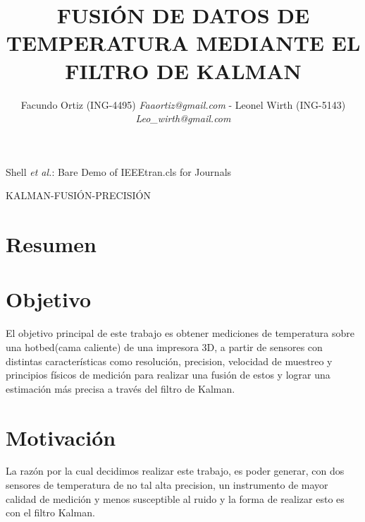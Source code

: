 \documentclass[journal]{IEEEtran}
\begin{document}
\title{FUSIÓN DE DATOS DE TEMPERATURA MEDIANTE EL FILTRO DE KALMAN}


\author{Facundo Ortiz (ING-4495) \textit{Faaortiz@gmail.com} - Leonel Wirth (ING-5143)  \textit{Leo\_wirth@gmail.com}}%



%
{Shell \MakeLowercase{\textit{et al.}}: Bare Demo of IEEEtran.cls for Journals}




\maketitle


\begin{IEEEkeywords}
KALMAN-FUSIÓN-PRECISIÓN
\end{IEEEkeywords}

\IEEEpeerreviewmaketitle

\section{Resumen}
\section{Objetivo}
El objetivo principal de este trabajo es obtener mediciones de temperatura sobre una hotbed(cama caliente) de una impresora 3D, a partir de sensores con distintas características como resolución, precision, velocidad de muestreo y principios físicos de medición para realizar una fusión de estos y lograr una estimación más precisa a través del filtro de Kalman.
\section{Motivación}
La razón por la cual decidimos
realizar este trabajo, es poder generar, con dos sensores
de temperatura de no tal alta precision, un instrumento de mayor
calidad de medición y menos susceptible al ruido y la forma
de realizar esto es con el filtro Kalman.
\end{document}
